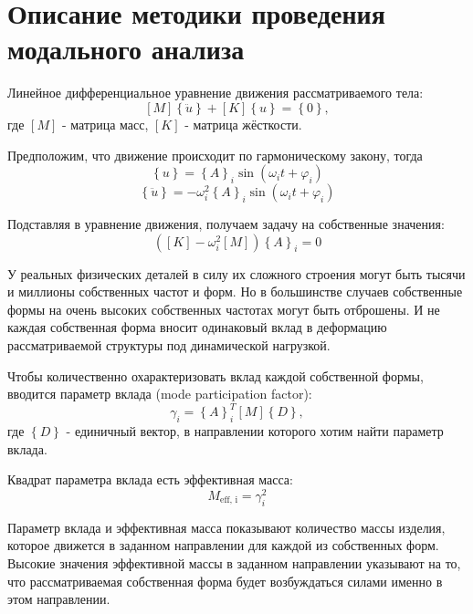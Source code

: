 \chapter{Описание методики проведения модального анализа} \label{ch1}

Линейное дифференциальное уравнение движения рассматриваемого тела:
\begin{equation}
\left[M\right]\left\{\ddot{u}\right\}+\left[K\right]\left\{u\right\}=\left\{0\right\},
\end{equation}
где $\left[M\right]$ - матрица масс, $\left[K\right]$ - матрица жёсткости.

Предположим, что движение происходит по гармоническому закону, тогда
\begin{equation}
\left\{u\right\}=\left\{A\right\}_i\sin{\left(\omega_i t+\varphi_i\right)}
\end{equation}
\begin{equation}
\left\{\ddot{u}\right\}=-\omega_i^2\left\{A\right\}_i\sin{\left(\omega_i t+\varphi_i\right)}
\end{equation}

Подставляя в уравнение движения, получаем задачу на собственные значения:
\begin{equation}
\left(\left[K\right]-\omega_i^2\left[M\right]\right)\left\{A\right\}_i=0
\end{equation}

У реальных физических деталей в силу их сложного строения могут быть тысячи и миллионы собственных частот и форм. Но в большинстве случаев собственные формы на очень высоких собственных частотах могут быть отброшены. И не каждая собственная форма вносит одинаковый вклад в деформацию рассматриваемой структуры под динамической нагрузкой.

Чтобы количественно охарактеризовать вклад каждой собственной формы, вводится параметр вклада (mode participation factor):
\begin{equation}
\gamma_i=\left\{A\right\}_i^{T}\left[M\right]\left\{D\right\},
\end{equation}
где $\left\{D\right\}$ - единичный вектор, в направлении которого хотим найти параметр вклада.

Квадрат параметра вклада есть эффективная масса:
\begin{equation}
M_{\text{eff, i}}=\gamma_i^2
\end{equation}

Параметр вклада и эффективная масса показывают количество массы изделия, которое движется в заданном направлении для каждой из собственных форм. Высокие значения эффективной массы в заданном направлении указывают на то, что рассматриваемая собственная форма будет возбуждаться силами именно в этом направлении.

